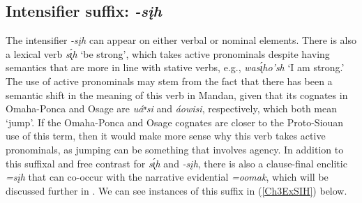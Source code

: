 	
	



\subsection{Intensifier suffix: \textit{-sįh}}\label{suffixintensifier}

The intensifier \textit{-sįh} can appear on either verbal or nominal elements. There is also a lexical verb \textit{s\'{ı̨}h} `be strong', which takes active pronominals despite having semantics that are more in line with stative verbs, e.g., \textit{was\'{ı̨}ho'sh} `I am strong.' The use of active pronominals may stem from the fact that there has been a semantic shift in the meaning of this verb in Mandan, given that its cognates in Omaha-Ponca and Osage are \textit{uáⁿsi} and \textit{áowisi}, respectively, which both mean `jump'. If the Omaha-Ponca and Osage cognates are closer to the Proto-Siouan use of this term, then it would make more sense why this verb takes active pronominals, as jumping can be something that involves agency. In addition to this suffixal and free contrast for \textit{s\'{ı̨}h} and \textit{-sįh}, there is also a clause-final enclitic \textit{=sįh} that can co-occur with the narrative evidential \textit{=oomak}, which will be discussed further in . We can see instances of this suffix in (\ref{Ch3ExSIH}) below.

